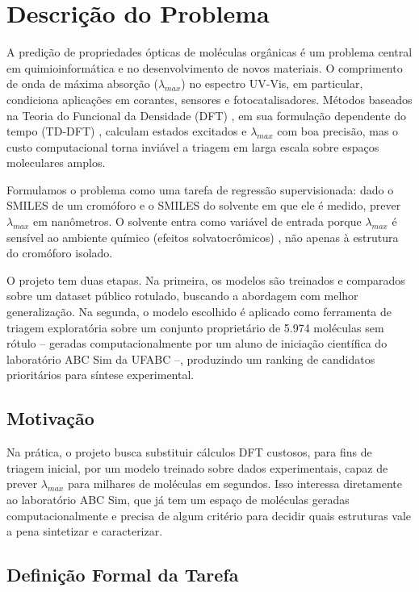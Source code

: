 \documentclass[12pt]{article}
\begin{document}
\section{Descrição do Problema}

A predição de propriedades ópticas de moléculas orgânicas é um problema central em quimioinformática e no desenvolvimento de novos materiais. O comprimento de onda de máxima absorção ($\lambda_{max}$) no espectro UV-Vis, em particular, condiciona aplicações em corantes, sensores e fotocatalisadores. Métodos baseados na Teoria do Funcional da Densidade (DFT) \cite{hohenberg1964,kohnsham1965}, em sua formulação dependente do tempo (TD-DFT) \cite{adamo2013}, calculam estados excitados e $\lambda_{max}$ com boa precisão, mas o custo computacional torna inviável a triagem em larga escala sobre espaços moleculares amplos.

Formulamos o problema como uma tarefa de regressão supervisionada: dado o SMILES de um cromóforo e o SMILES do solvente em que ele é medido, prever $\lambda_{max}$ em nanômetros. O solvente entra como variável de entrada porque $\lambda_{max}$ é sensível ao ambiente químico (efeitos solvatocrômicos) \cite{reichardt1994}, não apenas à estrutura do cromóforo isolado.

O projeto tem duas etapas. Na primeira, os modelos são treinados e comparados sobre um dataset público rotulado, buscando a abordagem com melhor generalização. Na segunda, o modelo escolhido é aplicado como ferramenta de triagem exploratória sobre um conjunto proprietário de 5.974 moléculas sem rótulo -- geradas computacionalmente por um aluno de iniciação científica do laboratório ABC Sim da UFABC --, produzindo um ranking de candidatos prioritários para síntese experimental.

\subsection{Motivação}

Na prática, o projeto busca substituir cálculos DFT custosos, para fins de triagem inicial, por um modelo treinado sobre dados experimentais, capaz de prever $\lambda_{max}$ para milhares de moléculas em segundos. Isso interessa diretamente ao laboratório ABC Sim, que já tem um espaço de moléculas geradas computacionalmente e precisa de algum critério para decidir quais estruturas vale a pena sintetizar e caracterizar.

\subsection{Definição Formal da Tarefa}
\end{document}
